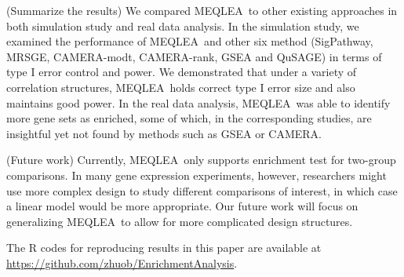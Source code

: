 \documentclass[a4,center,fleqn]{NAR}
\newcommand{\OurMethod}{MEQLEA}
\newcommand{\CMR}{CAMERA-rank}
\newcommand{\CMT}{CAMERA-modt}
\newcommand{\gent}{SigPathway}
\begin{document}
	(Summarize the results) We compared \OurMethod~to other existing approaches in both simulation
	study and real data analysis. In the simulation study, we examined the performance of \OurMethod~and
	other six method (\gent, MRSGE, \CMT, \CMR, GSEA and QuSAGE) in terms of type I error control and
	power. We demonstrated that under a variety of correlation structures, \OurMethod~holds correct type
	I error size and also maintains good power. In the real data analysis, \OurMethod~was able to
	identify more gene sets as enriched, some of which, in the corresponding studies, are insightful yet
	not found by methods such as GSEA or CAMERA.  
	
	(Future work) Currently, \OurMethod~only supports enrichment test for two-group comparisons. In
	many gene expression experiments, however, researchers might use more complex design to study
	different comparisons of interest, in which case a linear model would be more appropriate. Our
	future work will focus on generalizing \OurMethod~to allow for more complicated design structures. 
	
	The R codes for reproducing results in this paper are available at
	\url{https://github.com/zhuob/EnrichmentAnalysis}.
	
\end{document}
